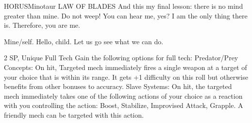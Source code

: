 \begin{mech}{HORUS}{Minotaur}
LAW OF BLADES
And this my final lesson: there is no mind greater than mine.
Do not weep! You can hear me, yes? I am the only thing there is. Therefore, you are me.

Mine/self. Hello, child. Let us go see what we can do.

2 SP, Unique
Full Tech
Gain the following options for full tech:
Predator/Prey Concepts: On hit, Targeted mech immediately fires a single weapon at a target of your choice that is within its range. It gets +1 difficulty on this roll but otherwise benefits from other bonuses to accuracy.
Slave Systems: On hit, the targeted mech immediately takes one of the following actions of your choice as a reaction with you controlling the action: Boost, Stabilize, Improvised Attack, Grapple. A friendly mech can be targeted with this action.


\end{mech}
